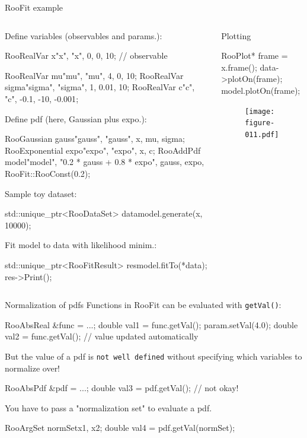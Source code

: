 \documentclass[aspectratio=169]{beamer}
\begin{document}
\begin{frame}[fragile]{RooFit example}
\begin{columns}
\begin{column}{0.5\textwidth}
Define variables (observables and params.):
\begin{myterminaltiny}
RooRealVar x{"x", "x", 0, 0, 10}; // observable

RooRealVar mu{"mu", "mu", 4, 0, 10};
RooRealVar sigma{"sigma", "sigma", 1, 0.01, 10};
RooRealVar c{"c", "c", -0.1, -10, -0.001};
\end{myterminaltiny}

Define pdf (here, Gaussian plus expo.):
\begin{myterminaltiny}
RooGaussian gauss{"gauss", "gauss", x, mu, sigma};
RooExponential expo{"expo", "expo", x, c};
RooAddPdf model{"model", "0.2 * gauss + 0.8 * expo",
                {gauss, expo}, {RooFit::RooConst(0.2)}};
\end{myterminaltiny}

Sample toy dataset:
\begin{myterminaltiny}
std::unique_ptr<RooDataSet> data{model.generate(x, 10000)};
\end{myterminaltiny}

Fit model to data with likelihood minim.:
\begin{myterminaltiny}
std::unique_ptr<RooFitResult> res{model.fitTo(*data)};
res->Print();
\end{myterminaltiny}
\end{column}
\begin{column}{0.5\textwidth}
Plotting
\begin{myterminaltiny}
RooPlot* frame = x.frame();
data->plotOn(frame);
model.plotOn(frame);
\end{myterminaltiny}
    \begin{figure}
        \texttt{[image: figure-011.pdf]}
    \end{figure}
\end{column}
\end{columns}
\end{frame}

\begin{frame}[fragile]{Normalization of pdfs}
Functions in RooFit can be evaluated with \texttt{getVal()}:
\begin{myterminal}
RooAbsReal &func = ...;
double val1 = func.getVal();
param.setVal(4.0);
double val2 = func.getVal(); // value updated automatically
\end{myterminal}

But the value of a pdf is \texttt{not well defined} without specifying which variables to normalize over!
\begin{myterminal}
RooAbsPdf &pdf = ...;
double val3 = pdf.getVal(); // not okay!
\end{myterminal}

You have to pass a "normalization set" to evaluate a pdf.
\begin{myterminal}
RooArgSet normSet{x1, x2};
double val4 = pdf.getVal(normSet);
\end{myterminal}
\end{frame}
\end{document}
